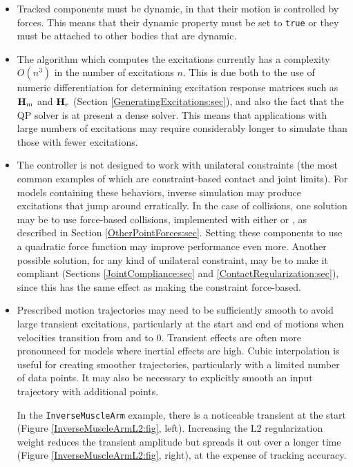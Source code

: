 \begin{itemize}

\item Tracked components must be dynamic, in that their
motion is controlled by forces. This means that their {\sf dynamic} property
must be set to {\tt true} or they must be attached to other bodies that are
dynamic.

\item The algorithm which computes the excitations currently
has a complexity $O(n^3)$ in the number of excitations $n$.  This is due both
to the use of numeric differentiation for determining excitation response
matrices such as ${\bf H}_m$ and ${\bf H}_e$ (Section
\ref{GeneratingExcitations:sec}), and also the fact that the QP solver
is at present a dense solver. This means that applications with large numbers
of excitations may require considerably longer to simulate than those with
fewer excitations.

\item The controller is not designed to work with
unilateral constraints (the most common examples of which are constraint-based
contact and joint limits). For models containing these behaviors, inverse
simulation may produce excitations that jump around erratically.  In the case
of collisions, one solution may be to use force-based collisions, implemented
with either
 or
, as described in Section
\ref{OtherPointForces:sec}. Setting these components to
use a quadratic force function may improve performance even more.  Another
possible solution, for any kind of unilateral constraint, may be to make it
compliant (Sections \ref{JointCompliance:sec}
and \ref{ContactRegularization:sec}), since this has the same effect as making
the constraint force-based.

\item Prescribed motion trajectories may need to be sufficiently
smooth to avoid large transient excitations, particularly at the start and end
of motions when velocities transition from and to 0. Transient effects are
often more pronounced for models where inertial effects are high.  Cubic
interpolation is useful for creating smoother trajectories, particularly with a
limited number of data points. It may also be necessary to explicitly smooth an
input trajectory with additional points.

In the {\tt InverseMuscleArm} example, there is a noticeable transient at the
start (Figure \ref{InverseMuscleArmL2:fig}, left). Increasing the L2
regularization weight reduces the transient amplitude but spreads it out over a
longer time (Figure \ref{InverseMuscleArmL2:fig}, right), at the expense of
tracking accuracy.

\end{itemize}

%
\ifdefined\maindoc
\else

\fi
